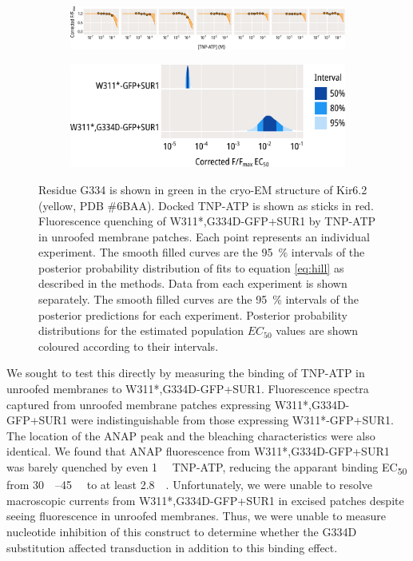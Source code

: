 \begin{figure}[h]
\begin{subfigure}[t]{0.5\textwidth}
	\end{subfigure}
	\vfill
	\begin{subfigure}[t]{0.9\textwidth}
		\caption{}\label{ch5fig:g334d_indfits}
		\centering
		\includegraphics[width=\textwidth]{g334d_3.pdf}
	\end{subfigure}
	\vfill
	\begin{subfigure}[t]{0.45\textwidth}
		\caption{}\label{ch5fig:g334d_params}
		\centering
		\includegraphics[width=\textwidth]{g334d_4.pdf}
	\end{subfigure}
	\caption[G334D abolishes nucleotide binding at Kir6.2]{
	 Residue G334 is shown in green in the cryo-EM structure of Kir6.2 (yellow, PDB \#6BAA).
	Docked TNP-ATP is shown as sticks in red.
	 Fluorescence quenching of W311*,G334D-GFP+SUR1 by TNP-ATP in unroofed membrane patches.
	Each point represents an individual experiment.
	The smooth filled curves are the \SI{95}{\percent} intervals of the posterior probability distribution of fits to equation \ref{eq:hill} as described in the methods.
	 Data from each experiment is shown separately.
	The smooth filled curves are the \SI{95}{\percent} intervals of the posterior predictions for each experiment.
	 Posterior probability distributions for the estimated population $EC_{50}$ values are shown coloured according to their intervals.
	}\label{ch5fig:g334d}
\end{figure}

We sought to test this directly by measuring the binding of TNP-ATP in unroofed membranes to W311*,G334D-GFP+SUR1.
Fluorescence spectra captured from unroofed membrane patches expressing W311*,G334D-GFP+SUR1 were indistinguishable from those expressing W311*-GFP+SUR1.
The location of the ANAP peak and the bleaching characteristics were also identical.
We found that ANAP fluorescence from W311*,G334D-GFP+SUR1 was barely quenched by even \SI{1}{\milli\Molar} TNP-ATP, reducing the apparant binding EC\textsubscript{50} from \SIrange{30}{45}{\micro\Molar} to at least \SI{2.8}{\milli\Molar}.
Unfortunately, we were unable to resolve macroscopic currents from W311*,G334D-GFP+SUR1 in excised patches despite seeing fluorescence in unroofed membranes.
Thus, we were unable to measure nucleotide inhibition of this construct to determine whether the G334D substitution affected transduction in addition to this binding effect.

